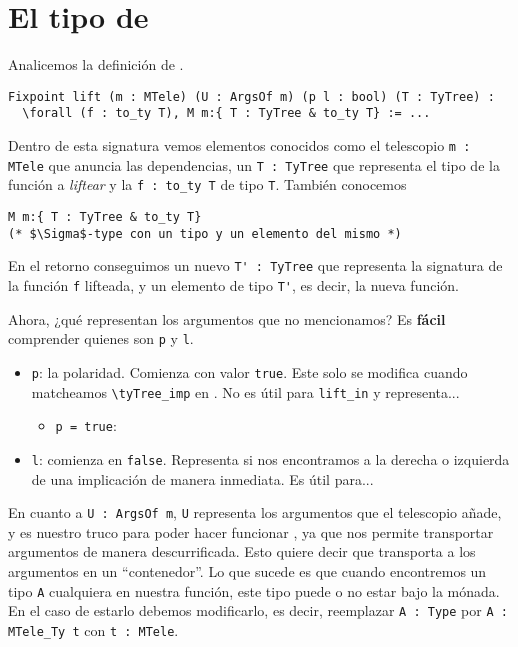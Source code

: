 
\section{El tipo de \lift}

Analicemos la definición de \lift.

\begin{lstlisting}
Fixpoint lift (m : MTele) (U : ArgsOf m) (p l : bool) (T : TyTree) :
  \forall (f : to_ty T), M m:{ T : TyTree & to_ty T} := ...
\end{lstlisting}

Dentro de esta signatura vemos elementos conocidos como el telescopio \lstinline{m : MTele} que anuncia las dependencias, un \lstinline{T : TyTree} que representa el tipo de la función a \textit{liftear} y la \lstinline{f : to_ty T} de tipo \lstinline{T}.
También conocemos
\begin{lstlisting}
M m:{ T : TyTree & to_ty T}
(* $\Sigma$-type con un tipo y un elemento del mismo *)
\end{lstlisting}

En el retorno conseguimos un nuevo \lstinline{T' : TyTree} que representa la signatura de la función \lstinline{f} lifteada, y un elemento de tipo \lstinline{T'}, es decir, la nueva función.

Ahora, ¿qué representan los argumentos que no mencionamos? Es \textbf{fácil} comprender quienes son \lstinline{p} y \lstinline{l}.
\begin{itemize}
    \item \lstinline{p}: la polaridad. Comienza con valor \lstinline{true}. Este solo se modifica cuando matcheamos \lstinline{\tyTree_imp} en \lift. No es útil para \lstinline{lift_in} y representa...
    \begin{itemize}
        \item \lstinline{p = true}:
    \end{itemize}
    \item \lstinline{l}: comienza en \lstinline{false}. Representa si nos encontramos a la derecha o izquierda de una implicación de manera inmediata. Es útil para...
\end{itemize}

En cuanto a \lstinline{U : ArgsOf m}, \lstinline{U} representa los argumentos que el telescopio añade, y es nuestro truco para poder hacer funcionar \lift, ya que nos permite transportar argumentos de manera descurrificada.
Esto quiere decir que transporta a los argumentos en un ``contenedor''.
Lo que sucede es que cuando encontremos un tipo \lstinline{A} cualquiera en nuestra función, este tipo puede o no estar bajo la mónada.
En el caso de estarlo debemos modificarlo, es decir, reemplazar \lstinline{A : Type} por \lstinline{A : MTele_Ty t} con \lstinline{t : MTele}.

